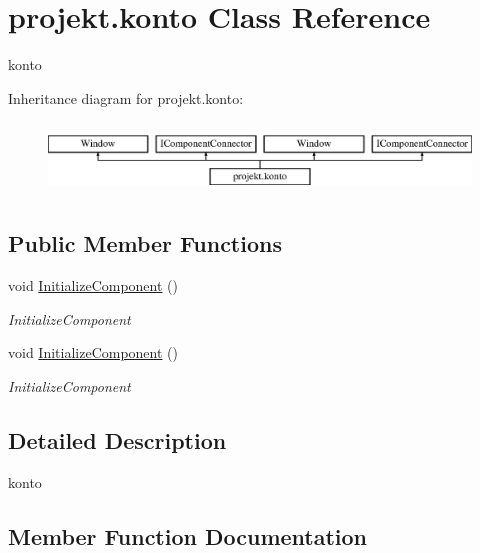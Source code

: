 \hypertarget{classprojekt_1_1konto}{}\section{projekt.\+konto Class Reference}
\label{classprojekt_1_1konto}


konto  


Inheritance diagram for projekt.\+konto\+:\begin{figure}[H]
\begin{center}
\leavevmode
\includegraphics[height=1.931034cm]{classprojekt_1_1konto}
\end{center}
\end{figure}
\subsection*{Public Member Functions}
\begin{DoxyCompactItemize}
\item 
void \mbox{\hyperlink{classprojekt_1_1konto_a7747c72ea9656125d46223a6930f86cf}{Initialize\+Component}} ()
\begin{DoxyCompactList}\small\item\em Initialize\+Component \end{DoxyCompactList}\item 
void \mbox{\hyperlink{classprojekt_1_1konto_a7747c72ea9656125d46223a6930f86cf}{Initialize\+Component}} ()
\begin{DoxyCompactList}\small\item\em Initialize\+Component \end{DoxyCompactList}\end{DoxyCompactItemize}


\subsection{Detailed Description}
konto 



\subsection{Member Function Documentation}
\mbox{\label{classprojekt_1_1konto_a7747c72ea9656125d46223a6930f86cf}} 
